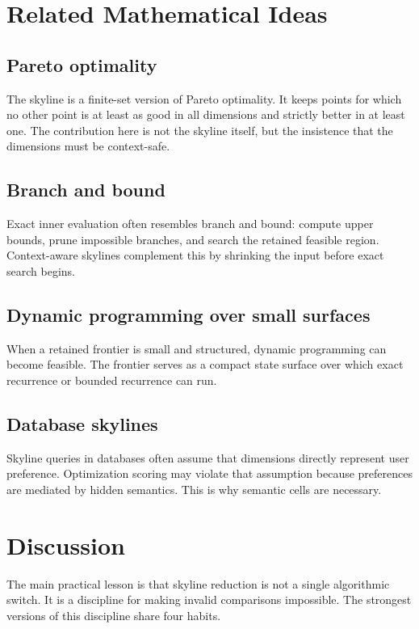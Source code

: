\documentclass[11pt,oneside]{article}
\theoremstyle{definition}
\begin{document}
\section{Related Mathematical Ideas}

\subsection{Pareto optimality}
The skyline is a finite-set version of Pareto optimality. It keeps points for which no other point is at least as good in all dimensions and strictly better in at least one. The contribution here is not the skyline itself, but the insistence that the dimensions must be context-safe.

\subsection{Branch and bound}
Exact inner evaluation often resembles branch and bound: compute upper bounds, prune impossible branches, and search the retained feasible region. Context-aware skylines complement this by shrinking the input before exact search begins.

\subsection{Dynamic programming over small surfaces}
When a retained frontier is small and structured, dynamic programming can become feasible. The frontier serves as a compact state surface over which exact recurrence or bounded recurrence can run.

\subsection{Database skylines}
Skyline queries in databases often assume that dimensions directly represent user preference. Optimization scoring may violate that assumption because preferences are mediated by hidden semantics. This is why semantic cells are necessary.

\section{Discussion}

The main practical lesson is that skyline reduction is not a single algorithmic switch. It is a discipline for making invalid comparisons impossible. The strongest versions of this discipline share four habits.
\end{document}
